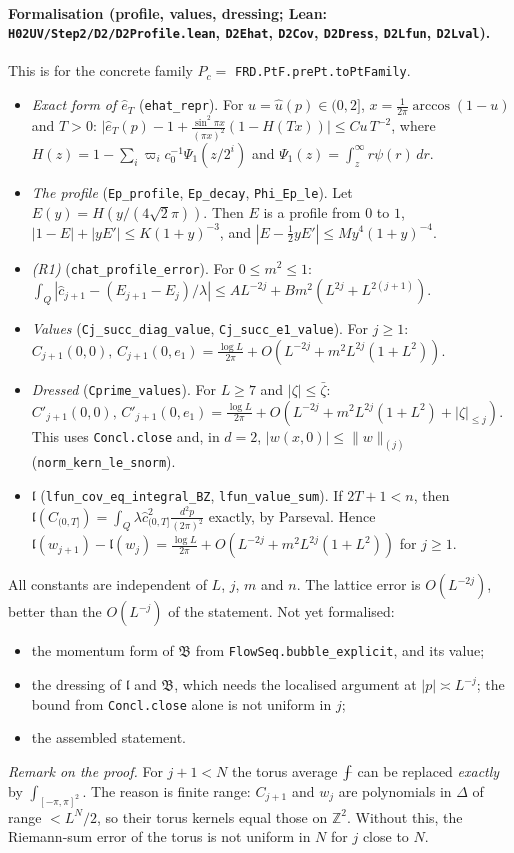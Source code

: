 \documentclass[11pt]{amsart}
\theoremstyle{definition}
\theoremstyle{remark}
\numberwithin{equation}{section}
\newcommand{\Z}{\mathbb{Z}}
\newcommand{\avint}{\mathop{\,\rlap{--}\!\!\int}\nolimits}
\begin{document}
\paragraph{Formalisation (profile, values, dressing; Lean: \texttt{H02UV/Step2/D2/D2Profile.lean},
\texttt{D2Ehat}, \texttt{D2Cov}, \texttt{D2Dress}, \texttt{D2Lfun}, \texttt{D2Lval}).}
This is for the concrete family $P_c=$ \texttt{FRD.PtF.prePt.toPtFamily}.
\begin{itemize}
\item \emph{Exact form of $\hat e_T$} (\texttt{ehat\_repr}). For $u=\hat u(p)\in(0,2]$,
  $x=\frac1{2\pi}\arccos(1-u)$ and $T>0$:
  $\bigl|\hat e_T(p)-1+\frac{\sin^2\pi x}{(\pi x)^2}(1-H(Tx))\bigr|\le Cu\,T^{-2}$, where
  $H(z)=1-\sum_i\varpi_ic_0^{-1}\Psi_1(z/2^i)$ and $\Psi_1(z)=\int_z^\infty r\psi(r)\,dr$.
\item \emph{The profile} (\texttt{Ep\_profile}, \texttt{Ep\_decay}, \texttt{Phi\_Ep\_le}). Let
  $E(y)=H(y/(4\sqrt2\pi))$. Then $E$ is a profile from $0$ to $1$,
  $|1-E|+|yE'|\le K(1+y)^{-3}$, and $|E-\frac12yE'|\le My^4(1+y)^{-4}$.
\item \emph{(R1)} (\texttt{chat\_profile\_error}). For $0\le m^2\le1$:
  $\int_Q|\hat c_{j+1}-(E_{j+1}-E_j)/\lambda|\le AL^{-2j}+Bm^2(L^{2j}+L^{2(j+1)})$.
\item \emph{Values} (\texttt{Cj\_succ\_diag\_value}, \texttt{Cj\_succ\_e1\_value}). For $j\ge1$:
  $C_{j+1}(0,0),\,C_{j+1}(0,e_1)=\frac{\log L}{2\pi}+O(L^{-2j}+m^2L^{2j}(1+L^2))$.
\item \emph{Dressed} (\texttt{Cprime\_values}). For $L\ge7$ and $|\zeta|\le\bar\zeta$:
  $C'_{j+1}(0,0),\,C'_{j+1}(0,e_1)=\frac{\log L}{2\pi}+O(L^{-2j}+m^2L^{2j}(1+L^2)+|\zeta|_{\le j})$.
  This uses \texttt{Concl.close} and, in $d=2$, $|w(x,0)|\le\|w\|_{(j)}$ (\texttt{norm\_kern\_le\_snorm}).
\item \emph{$\mathfrak l$} (\texttt{lfun\_cov\_eq\_integral\_BZ}, \texttt{lfun\_value\_sum}). If $2T+1<n$, then
  $\mathfrak l(C_{(0,T]})=\int_Q\lambda\hat c_{(0,T]}^2\frac{d^2p}{(2\pi)^2}$ exactly, by Parseval. Hence
  $\mathfrak l(w_{j+1})-\mathfrak l(w_j)=\frac{\log L}{2\pi}+O(L^{-2j}+m^2L^{2j}(1+L^2))$ for $j\ge1$.
\end{itemize}
All constants are independent of $L$, $j$, $m$ and $n$. The lattice error is $O(L^{-2j})$, better
than the $O(L^{-j})$ of the statement. Not yet formalised:
\begin{itemize}
\item the momentum form of $\mathfrak B$ from \texttt{FlowSeq.bubble\_explicit}, and its value;
\item the dressing of $\mathfrak l$ and $\mathfrak B$, which needs the localised argument at
  $|p|\asymp L^{-j}$; the bound from \texttt{Concl.close} alone is not uniform in $j$;
\item the assembled statement.
\end{itemize}
\emph{Remark on the proof.} For $j+1<N$ the torus average $\avint$ can be replaced
\emph{exactly} by $\int_{[-\pi,\pi]^2}$. The reason is finite range: $C_{j+1}$ and $w_j$ are
polynomials in $\Delta$ of range $<L^N/2$, so their torus kernels equal those on $\Z^2$. Without
this, the Riemann-sum error of the torus is not uniform in $N$ for $j$ close to $N$.
\end{document}
